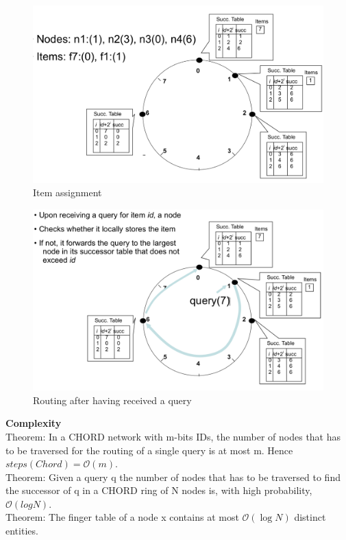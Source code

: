 \documentclass[paper=a4, fontsize=11pt]{scrartcl} %
\numberwithin{equation}{section} %
\numberwithin{figure}{section} %
\numberwithin{table}{section} %
\begin{document}
 \begin{figure}[H]
  \centering
  \includegraphics[width=1\textwidth]{img/chord4.png}
  \caption{Item assignment}
  
\end{figure}
 \begin{figure}[H]
  \centering
  \includegraphics[width=1\textwidth]{img/chord_query.png}
  \caption{Routing after having received a query}
  
\end{figure}

\textbf{Complexity}\\
Theorem: In a CHORD network with m-bits IDs, the number
of nodes that has to be traversed for the routing of a single
query is at most m. Hence $steps(Chord) = \mathcal{O}(m)$.\\
Theorem: Given a query q the number of nodes that has to
be traversed to find the successor of q in a CHORD ring of N
nodes is, with high probability, $\mathcal{O}(log N)$.\\
Theorem: The finger table of a node x contains at most $\mathcal{O}(\log N)$ distinct entities.
\end{document}
